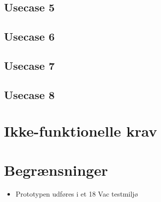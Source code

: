 \subsection{Usecase 5}


\subsection{Usecase 6}


\subsection{Usecase 7}



\subsection{Usecase 8}



\section{Ikke-funktionelle krav}



\section{Begrænsninger}
\begin{itemize}
\item Prototypen udføres i et 18 Vac testmiljø
\end{itemize}
